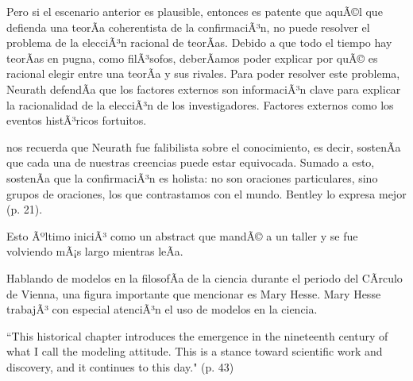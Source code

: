Pero si el escenario anterior es plausible, entonces es patente que aquÃ©l que defienda una teorÃ­a coherentista de la confirmaciÃ³n, no puede resolver el problema de la elecciÃ³n racional de teorÃ­as.
Debido a que todo el tiempo hay teorÃ­as en pugna, como filÃ³sofos, deberÃ­amos poder explicar por quÃ© es racional elegir entre una teorÃ­a y sus rivales. Para poder resolver este problema, Neurath defendÃ­a que los factores externos son informaciÃ³n clave para explicar la racionalidad de la elecciÃ³n de los investigadores.
Factores externos como los eventos histÃ³ricos fortuitos.

\textcite{Bentley2023} nos recuerda que Neurath fue falibilista sobre el conocimiento, es decir,  sostenÃ­a que cada una de nuestras creencias puede estar equivocada.
Sumado a esto, sostenÃ­a que la confirmaciÃ³n es holista: no son oraciones particulares, sino grupos de oraciones, los que contrastamos con el mundo.
Bentley lo expresa mejor  (p. 21).



Esto Ãºltimo iniciÃ³ como un abstract que mandÃ© a un taller y se fue volviendo mÃ¡s largo mientras leÃ­a.

Hablando de modelos en la filosofÃ­a de la ciencia durante el periodo del CÃ­rculo de Vienna, una figura importante que mencionar es Mary Hesse.
Mary Hesse trabajÃ³ con especial atenciÃ³n el uso de modelos en la ciencia.

``This historical chapter introduces the emergence in the nineteenth century of  what I call the modeling attitude.
This is a stance toward scientific work and  discovery, and it continues to this day." (p. 43)






